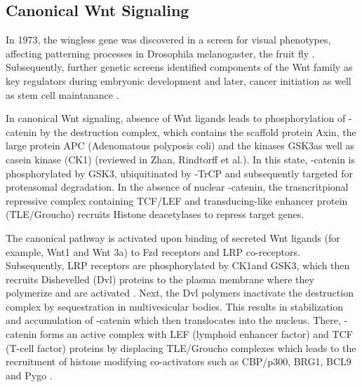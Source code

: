 \begin{flushleft}
\subsection{Canonical Wnt Signaling}
In 1973, the wingless gene was discovered in a screen for visual phenotypes, affecting patterning processes in Drosophila melanogaster, the fruit fly \cite{Sharma1973WinglessMelanogaster.}. Subsequently, further genetic screens identified components of the Wnt family as key regulators during embryonic development and later, cancer initiation as well as stem cell maintanance  \cite{Nusslein-Volhard1980MutationsDrosophila}. \par 

In canonical Wnt signaling, absence of Wnt ligands leads to phosphorylation of \textbeta-catenin by the destruction complex, which contains the scaffold protein Axin, the large protein APC (Adenomatous polyposis coli) and the kinases GSK3\textbeta as well as casein kinase (CK1\textalpha) (reviewed in Zhan, Rindtorff et al.\cite{Zhan2017}). 
In this state, \textbeta-catenin is phosphorylated by GSK3\textbeta, ubiquitinated by \textbeta-TrCP and subsequently targeted for proteasomal degradation. 
In the absence of nuclear \textbeta-catenin, the trasncritpional repressive complex containing TCF/LEF and transducing-like enhancer protein (TLE/Groucho) recruits Histone deacetylases to repress target genes. \par 

The canonical pathway is activated upon binding of secreted Wnt ligands (for example, Wnt1 and Wnt 3a) to Fzd receptors and LRP co-receptors. 
Subsequently, LRP receptors are  phosphorylated by CK1\textalpha and GSK3\textbeta, which then recruits Dishevelled (Dvl) proteins to the plasma membrane where they polymerize and are activated \cite{Metcalfe2011}. Next, the Dvl polymers inactivate the destruction complex by sequestration in multivesicular bodies. This results in stabilization and accumulation of \textbeta-catenin which then translocates into the nucleus. There, \textbeta-catenin forms an active complex with LEF (lymphoid enhancer factor) and TCF (T-cell factor) proteins by displacing TLE/Groucho complexes which leads to the recruitment of histone modifying co-activators such as CBP/p300, BRG1, BCL9 and Pygo \cite{Lien2014WntSignaling}. \par 


\end{flushleft}
